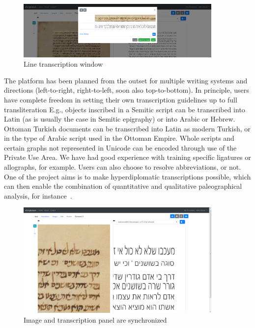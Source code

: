 \begin{figure}
	\centering
	\includegraphics[width=0.9\textwidth]{transcription_window.png}
	\caption{Line transcription window}
	\label{fig_ost:transcription}
\end{figure}

The platform has been planned from the outset for multiple writing systems and
directions (left-to-right, right-to-left, soon also top-to-bottom). In
principle, users have complete freedom in setting their own transcription
guidelines up to full transliteration E.g., objects inscribed in a Semitic
script can be transcribed into Latin (as is usually the case in Semitic
epigraphy) or into Arabic or Hebrew. Ottoman Turkish documents can be
transcribed into Latin as modern Turkish, or in the type of Arabic script used
in the Ottoman Empire.  Whole scripts and certain graphs not represented in
Unicode can be encoded through use of the Private Use Area. We have had good
experience with training specific ligatures or allographs, for example. Users
can also choose to resolve abbreviations, or not. One of the project aims is to
make hyperdiplomatic transcriptions possible, which can then enable the
combination of quantitative and qualitative paleographical analysis, for
instance~\cite{kiessling2019escripta}.

\begin{figure}[h]
	\centering
	\includegraphics[width=0.9\textwidth]{zoom.png}
	\caption{Image and transcription panel are synchronized}
	\label{fig_ost:zoom}
\end{figure}

